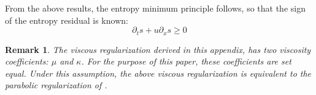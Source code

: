 \documentclass[review]{elsarticle}
\newtheorem{remark}{Remark}[section]
\newcommand{\sect}[1]{Section~\ref{#1}}                     %
\begin{document}
\begin{appendices}
From the above results, the entropy minimum principle follows, so that the sign of the entropy residual is known:
\begin{equation}
\boxed{\partial_t s + u \partial_x s \geq 0}
\end{equation}
\begin{remark}
The viscous regularization derived in this appendix, has two viscosity coefficients: $\mu$ and $\kappa$. For the purpose of this paper, these coefficients are set equal. Under this assumption, the above viscous regularization is equivalent to the parabolic regularization of \cite{Parabolic}.
\end{remark}
\end{appendices}
\end{document}
